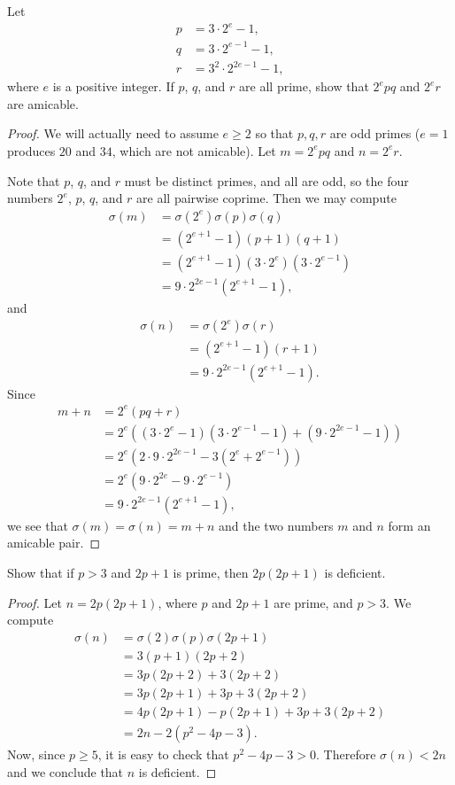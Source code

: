  Let
\begin{align*}
  p &= 3\cdot2^e - 1, \\
  q &= 3\cdot2^{e-1} - 1, \\
  r &= 3^2\cdot2^{2e-1} - 1,
\end{align*}
where $e$ is a positive integer. If $p$, $q$, and $r$ are all prime,
show that $2^epq$ and $2^er$ are amicable.
\begin{proof}
  We will actually need to assume $e\geq2$ so that $p,q,r$ are odd
  primes ($e = 1$ produces $20$ and $34$, which are not
  amicable). Let $m = 2^epq$ and $n = 2^er$.

  Note that $p$, $q$, and $r$ must be distinct primes, and all are
  odd, so the four numbers $2^e$, $p$, $q$, and $r$ are all pairwise
  coprime. Then we may compute
  \begin{align*}
    \sigma(m)
    &= \sigma(2^e)\sigma(p)\sigma(q) \\
    &= (2^{e+1} - 1)(p + 1)(q + 1) \\
    &= (2^{e+1} - 1)(3\cdot2^e)(3\cdot2^{e-1}) \\
    &= 9\cdot2^{2e-1}(2^{e+1} - 1),
  \end{align*}
  and
  \begin{align*}
    \sigma(n)
    &= \sigma(2^e)\sigma(r) \\
    &= (2^{e+1} - 1)(r + 1) \\
    &= 9\cdot2^{2e-1}(2^{e+1} - 1).
  \end{align*}
  Since
  \begin{align*}
    m + n
    &= 2^e(pq + r) \\
    &= 2^e((3\cdot2^e - 1)(3\cdot2^{e-1} - 1) + (9\cdot2^{2e-1} - 1)) \\
    &= 2^e(2\cdot9\cdot2^{2e-1} - 3(2^e + 2^{e-1})) \\
    &= 2^e(9\cdot2^{2e} - 9\cdot2^{e-1}) \\
    &= 9\cdot2^{2e-1}(2^{e+1} - 1),
  \end{align*}
  we see that $\sigma(m) = \sigma(n) = m + n$ and the two numbers $m$
  and $n$ form an amicable pair.
\end{proof}

 Show that if $p > 3$ and $2p + 1$ is prime, then
$2p(2p+1)$ is deficient.
\begin{proof}
  Let $n = 2p(2p+1)$, where $p$ and $2p + 1$ are prime, and $p >
  3$. We compute
  \begin{align*}
    \sigma(n)
    &= \sigma(2)\sigma(p)\sigma(2p+1) \\
    &= 3(p+1)(2p+2) \\
    &= 3p(2p+2) + 3(2p+2) \\
    &= 3p(2p+1) + 3p + 3(2p+2) \\
    &= 4p(2p+1) - p(2p+1) + 3p + 3(2p+2) \\
    &= 2n - 2(p^2 - 4p - 3).
  \end{align*}
  Now, since $p\geq5$, it is easy to check that $p^2 - 4p - 3 >
  0$. Therefore $\sigma(n) < 2n$ and we conclude that $n$ is
  deficient.
\end{proof}

